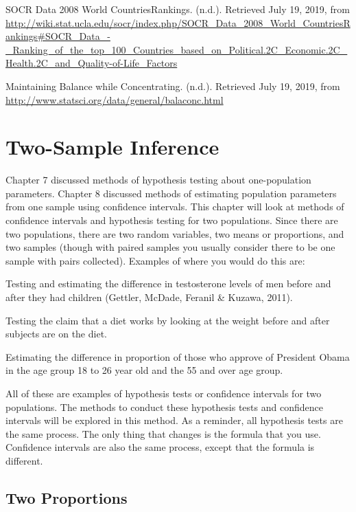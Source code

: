 \documentclass[]{book}
\begin{document}
SOCR Data 2008 World CountriesRankings. (n.d.). Retrieved July 19, 2019, from \url{http://wiki.stat.ucla.edu/socr/index.php/SOCR_Data_2008_World_CountriesRankings\#SOCR_Data_-_Ranking_of_the_top_100_Countries_based_on_Political.2C_Economic.2C_Health.2C_and_Quality-of-Life_Factors}

Maintaining Balance while Concentrating. (n.d.). Retrieved July 19, 2019, from \url{http://www.statsci.org/data/general/balaconc.html}

\hypertarget{two-sample-inference}{%
\chapter{Two-Sample Inference}\label{two-sample-inference}}

Chapter 7 discussed methods of hypothesis testing about one-population parameters. Chapter 8 discussed methods of estimating population parameters from one sample using confidence intervals. This chapter will look at methods of confidence intervals and hypothesis testing for two populations. Since there are two populations, there are two random variables, two means or proportions, and two samples (though with paired samples you usually consider there to be one sample with pairs collected). Examples of where you would do this are:

Testing and estimating the difference in testosterone levels of men before and after they had children (Gettler, McDade, Feranil \& Kuzawa, 2011).

Testing the claim that a diet works by looking at the weight before and after subjects are on the diet.

Estimating the difference in proportion of those who approve of President Obama in the age group 18 to 26 year old and the 55 and over age group.

All of these are examples of hypothesis tests or confidence intervals for two populations. The methods to conduct these hypothesis tests and confidence intervals will be explored in this method. As a reminder, all hypothesis tests are the same process. The only thing that changes is the formula that you use. Confidence intervals are also the same process, except that the formula is different.

\hypertarget{two-proportions}{%
\section{Two Proportions}\label{two-proportions}}
\end{document}
